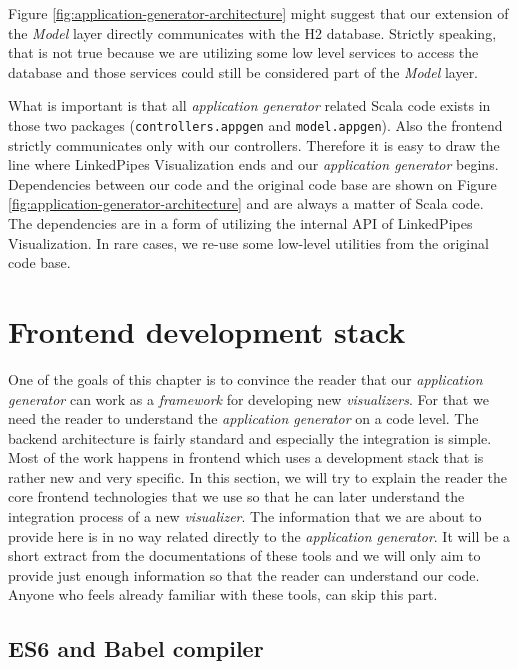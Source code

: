 Figure \ref{fig:application-generator-architecture} might suggest that our extension of the \emph{Model} layer directly communicates with the H2 database. Strictly speaking, that is not true because we are utilizing some low level services to access the database and those services could still be considered part of the \emph{Model} layer.

What is important is that all \emph{application generator} related Scala code exists in those two packages (\texttt{controllers.appgen} and \texttt{model.appgen}). Also the frontend strictly communicates only  with our controllers. Therefore it is easy to draw the line where LinkedPipes Visualization ends and our \emph{application generator} begins. Dependencies between our code and the original code base are shown on Figure \ref{fig:application-generator-architecture} and are always a matter of Scala code. The dependencies are in a form of utilizing the internal API of LinkedPipes Visualization. In rare cases, we re-use some low-level utilities from the original code base.

\section{Frontend development stack}
\label{sec:implementation:frontend-development-stack}

One of the goals of this chapter is to convince the reader that our \emph{application generator} can work as a \emph{framework} for developing new \emph{visualizers}. For that we need the reader to understand the \emph{application generator} on a code level. The backend architecture is fairly standard and especially the integration is simple. Most of the work happens in frontend which uses a development stack that is rather new and very specific. In this section, we will try to explain the reader the core frontend technologies that we use so that he can later understand the integration process of a new \emph{visualizer}. The information that we are about to provide here is in no way related directly to the \emph{application generator}. It will be a short extract from the documentations of these tools and we will only aim to provide just enough information so that the reader can understand our code. Anyone who feels already familiar with these tools, can skip this part.

\subsection{ES6 and Babel compiler}

